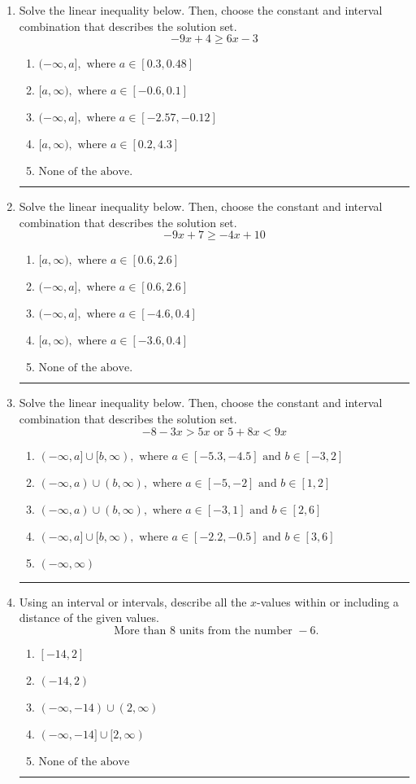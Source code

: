 \documentclass[14pt]{extbook}
\newcommand{\litem}[1]{\item#1\hspace*{-1cm}\rule{\textwidth}{0.4pt}}
\begin{document}
\begin{enumerate}
{\begin{enumerate}[label=\Alph*.]
\end{enumerate} }
\litem{
Solve the linear inequality below. Then, choose the constant and interval combination that describes the solution set.\[ -9x + 4 \geq 6x -3 \]\begin{enumerate}[label=\Alph*.]
\item \( (-\infty, a], \text{ where } a \in [0.3, 0.48] \)
\item \( [a, \infty), \text{ where } a \in [-0.6, 0.1] \)
\item \( (-\infty, a], \text{ where } a \in [-2.57, -0.12] \)
\item \( [a, \infty), \text{ where } a \in [0.2, 4.3] \)
\item \( \text{None of the above}. \)

\end{enumerate} }
\litem{
Solve the linear inequality below. Then, choose the constant and interval combination that describes the solution set.\[ -9x + 7 \geq -4x + 10 \]\begin{enumerate}[label=\Alph*.]
\item \( [a, \infty), \text{ where } a \in [0.6, 2.6] \)
\item \( (-\infty, a], \text{ where } a \in [0.6, 2.6] \)
\item \( (-\infty, a], \text{ where } a \in [-4.6, 0.4] \)
\item \( [a, \infty), \text{ where } a \in [-3.6, 0.4] \)
\item \( \text{None of the above}. \)

\end{enumerate} }
\litem{
Solve the linear inequality below. Then, choose the constant and interval combination that describes the solution set.\[ -8 - 3 x > 5 x \text{ or } 5 + 8 x < 9 x \]\begin{enumerate}[label=\Alph*.]
\item \( (-\infty, a] \cup [b, \infty), \text{ where } a \in [-5.3, -4.5] \text{ and } b \in [-3, 2] \)
\item \( (-\infty, a) \cup (b, \infty), \text{ where } a \in [-5, -2] \text{ and } b \in [1, 2] \)
\item \( (-\infty, a) \cup (b, \infty), \text{ where } a \in [-3, 1] \text{ and } b \in [2, 6] \)
\item \( (-\infty, a] \cup [b, \infty), \text{ where } a \in [-2.2, -0.5] \text{ and } b \in [3, 6] \)
\item \( (-\infty, \infty) \)

\end{enumerate} }
\litem{
Using an interval or intervals, describe all the $x$-values within or including a distance of the given values.\[ \text{ More than } 8 \text{ units from the number } -6. \]\begin{enumerate}[label=\Alph*.]
\item \( [-14, 2] \)
\item \( (-14, 2) \)
\item \( (-\infty, -14) \cup (2, \infty) \)
\item \( (-\infty, -14] \cup [2, \infty) \)
\item \( \text{None of the above} \)


\end{enumerate}}
\end{enumerate}
\end{document}
